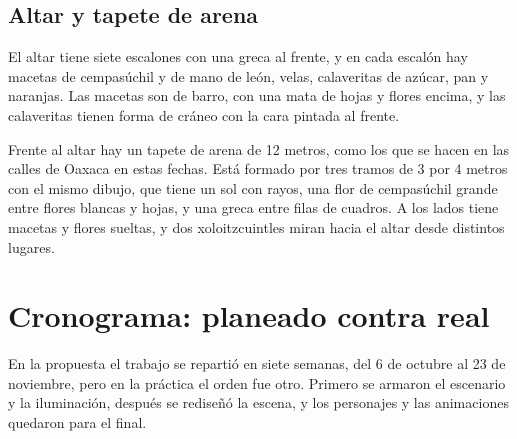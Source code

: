 \documentclass[11pt,a4paper]{article}
\begin{document}
\subsection{Altar y tapete de arena}

El altar tiene siete escalones con una greca al frente, y en cada escalón hay macetas de cempasúchil y de mano de león, velas, calaveritas de azúcar, pan y naranjas. Las macetas son de barro, con una mata de hojas y flores encima, y las calaveritas tienen forma de cráneo con la cara pintada al frente.

Frente al altar hay un tapete de arena de 12 metros, como los que se hacen en las calles de Oaxaca en estas fechas. Está formado por tres tramos de 3 por 4 metros con el mismo dibujo, que tiene un sol con rayos, una flor de cempasúchil grande entre flores blancas y hojas, y una greca entre filas de cuadros. A los lados tiene macetas y flores sueltas, y dos xoloitzcuintles miran hacia el altar desde distintos lugares.



\section{Cronograma: planeado contra real}

En la propuesta el trabajo se repartió en siete semanas, del 6 de octubre al 23 de noviembre, pero en la práctica el orden fue otro. Primero se armaron el escenario y la iluminación, después se rediseñó la escena, y los personajes y las animaciones quedaron para el final.
\end{document}
